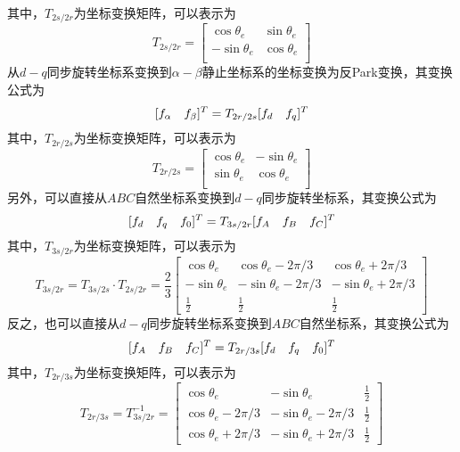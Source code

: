 其中，$T_{2s/2r}$为坐标变换矩阵，可以表示为
\begin{equation}
T_{2s/2r}=\left[
\begin{array}{ccc}
   \cos{\theta_e} & \sin{\theta_e}  \\
  -\sin{\theta_e} & \cos{\theta_e}  \\ 
\end{array}
\right]
\end{equation}
从$d-q$同步旋转坐标系变换到$\alpha-\beta$静止坐标系的坐标变换为反Park变换，其变换公式为
\begin{equation}
\centering
[f_\alpha \quad f_\beta]^T=T_{2r/2s}[f_d \quad f_q]^T
\end{equation}
其中，$T_{2r/2s}$为坐标变换矩阵，可以表示为
\begin{equation}
T_{2r/2s}=\left[
\begin{array}{ccc}
   \cos{\theta_e} & -\sin{\theta_e}  \\
   \sin{\theta_e} & \cos{\theta_e}  \\ 
\end{array}
\right]
\end{equation}
另外，可以直接从$ABC$自然坐标系变换到$d-q$同步旋转坐标系，其变换公式为
\begin{equation}
\centering
[f_d \quad f_q \quad f_0]^T=T_{3s/2r}[f_A \quad f_B \quad f_C]^T
\end{equation}
其中，$T_{3s/2r}$为坐标变换矩阵，可以表示为
\begin{equation}
T_{3s/2r}=T_{3s/2s}\cdot T_{2s/2r}=\frac{2}{3}\left[
\begin{array}{ccc}
  \cos{\theta_e} & \cos{\theta_e-2\pi/3} & \cos{\theta_e+2\pi/3}  \\
  -\sin{\theta_e} & -\sin{\theta_e-2\pi/3} & -\sin{\theta_e+2\pi/3}  \\
  \frac{1}{2} & \frac{1}{2} & \frac{1}{2}
\end{array}
\right]
\end{equation}
反之，也可以直接从$d-q$同步旋转坐标系变换到$ABC$自然坐标系，其变换公式为
\begin{equation}
\centering
[f_A \quad f_B \quad f_C]^T=T_{2r/3s}[f_d \quad f_q \quad f_0]^T
\end{equation}
其中，$T_{2r/3s}$为坐标变换矩阵，可以表示为
\begin{equation}
T_{2r/3s}=T_{3s/2r}^{-1}=\left[
\begin{array}{ccc}
  \cos{\theta_e} & -\sin{\theta_e} & \frac{1}{2}  \\
  \cos{\theta_e-2\pi/3} & -\sin{\theta_e-2\pi/3} & \frac{1}{2}  \\
  \cos{\theta_e+2\pi/3} & -\sin{\theta_e+2\pi/3} & \frac{1}{2} 
\end{array}
\right]
\end{equation}

